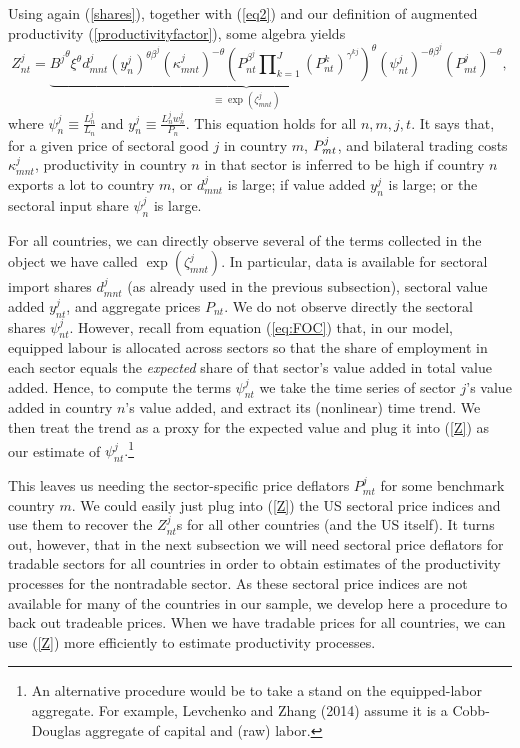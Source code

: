 \documentclass[12pt]{article}
\begin{document}
Using again (\ref{shares}), together with (\ref{eq2}) and our definition of
augmented productivity (\ref{productivityfactor}), some algebra yields 
\begin{equation}
Z_{nt}^{j}=\underbrace{{B^{j}}^{\theta }{\xi }^{\theta }d_{mnt}^{j}\left(
y_{n}^{j}\right) ^{\theta \beta ^{j}}\left( \kappa _{mnt}^{j}\right)
^{-\theta }\left( P_{nt}^{\beta
^{j}}\prod\nolimits_{k=1}^{J}(P_{nt}^{k})^{\gamma ^{kj}}\right) ^{\theta
}\left( \psi _{nt}^{j}\right) ^{-\theta \beta ^{j}}}_{\equiv \exp (\zeta
_{mnt}^{j})}\left( {P_{mt}^{j}}\right) ^{-\theta },  \label{Z}
\end{equation}%
where $\psi _{n}^{j}\equiv \frac{L_{n}^{j}}{L_{n}}$ and $y_{n}^{j}\equiv 
\frac{L_{n}^{j}w_{n}^{j}}{P_{n}}$. This equation holds for all $n,m,j,t$. It
says that, for a given price of sectoral good $j$ in country $m$, ${%
P_{mt}^{j}}$, and bilateral trading costs $\kappa _{mnt}^{j}$, productivity
in country $n$ in that sector is inferred to be high if country $n$ exports
a lot to country $m$, or $d_{mnt}^{j}$ is large; if value added $y_{n}^{j}$
is large; or the sectoral input share $\psi _{n}^{j}$ is large.

For all countries, we can directly observe several of the terms collected in
the object we have called $\exp (\zeta _{mnt}^{j})$. In particular, data is
available for sectoral import shares $d_{mnt}^{j}$ (as already used in the
previous subsection), sectoral value added $y_{nt}^{j}$, and aggregate
prices $P_{nt}$. We do not observe directly the sectoral shares $\psi
_{nt}^{j}$. However, recall from equation (\ref{eq:FOC}) that, in our model,
equipped labour is allocated across sectors so that the share of employment
in each sector equals the \textit{expected} share of that sector's value
added in total value added. Hence, to compute the terms $\psi _{nt}^{j}$ we
take the time series of sector $j$'s value added in country $n$'s value
added, and extract its (nonlinear) time trend. We then treat the trend as a
proxy for the expected value and plug it into (\ref{Z}) as our estimate of $%
\psi _{nt}^{j}.$\footnote{%
An alternative procedure would be to take a stand on the equipped-labor
aggregate. For example, Levchenko and Zhang (2014) assume it is a
Cobb-Douglas aggregate of capital and (raw) labor.}

This leaves us needing the sector-specific price deflators ${P_{mt}^{j}}$
for some benchmark country $m$. We could easily just plug into (\ref{Z}) the
US sectoral price indices and use them to recover the $Z_{nt}^{j}$s for all
other countries (and the US itself). It turns out, however, that in the next
subsection we will need sectoral price deflators for tradable sectors for
all countries in order to obtain estimates of the productivity processes for
the nontradable sector. As these sectoral price indices are not available
for many of the countries in our sample, we develop here a procedure to back
out tradeable prices. When we have tradable prices for all countries, we can
use (\ref{Z}) more efficiently to estimate productivity processes.
\end{document}
